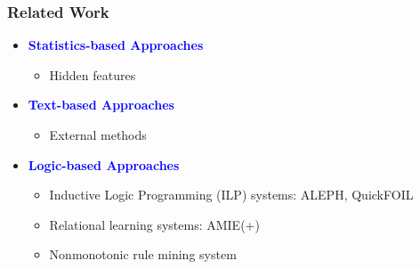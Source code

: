 \documentclass{beamer}
\newcommand{\naf}{{\it not}\,}
\newcommand{\bl}[1]{\textcolor{blue}{#1}}
\newcommand{\gr}[1]{\textcolor{darkgreen}{#1}}
\def\cG{\ensuremath{\mathcal{G}}}
\def\cR{\ensuremath{\mathcal{R}}}
\newcommand{\mi}[1]{\ensuremath{\mathit{#1}}}
\begin{document}
%
%
%
%
\begin{frame}\frametitle{Related Work}
\begin{itemize}
\item \textbf{\bl{Statistics-based Approaches}}
\begin{itemize}
\item Hidden features~\cite{rescal}
\end{itemize}
\medskip
\bigskip

\item \textbf{\bl{Text-based Approaches}}
\begin{itemize}
\item External methods~\cite{match}
\end{itemize}
\medskip
\bigskip

\item \textbf{\bl{Logic-based Approaches}}
\begin{itemize}
\item Inductive Logic Programming (ILP) systems: ALEPH, QuickFOIL~\cite{quickfoil}
\item Relational learning systems: AMIE(+)~\cite{amie}
\item Nonmonotonic rule mining system~\cite{iswc2016}
\end{itemize}
\medskip

\end{itemize}
\end{frame}


\end{document}
